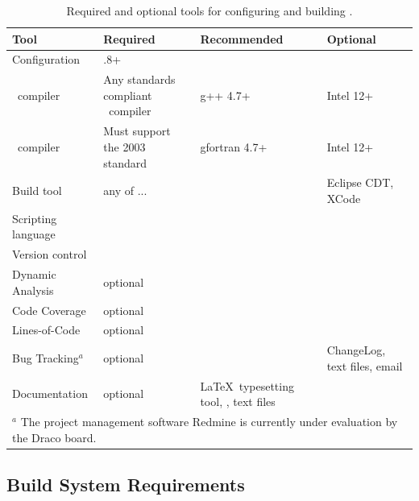 \begin{table}[ht]
  \begin{center}
    \caption{Required and optional tools for configuring and building \draco.}
    \label{tab:reqtools}
    \begin{tabular}{lp{1.5in}p{1.5in}p{1.5in}}\hline\hline
    
          Tool & Required  & Recommended & Optional \\ \hline
	Configuration & \cmake-2.8.8+ & \ctest & \cdash  \\
	\cpp\ compiler     & Any standards compliant \cpp\ compiler & g++ 4.7+ & Intel 12+ \\
	\fortran\ compiler & Must support the 2003 standard         & gfortran 4.7+ & Intel 12+ \\
	Build tool         & any of ... & \gmake & Eclipse CDT, XCode \\
	Scripting language & \cmake     & \python & \perl \\
	Version control    & \svn       & & \git \\
	Dynamic Analysis   & optional   & \valgrind & \\
	Code Coverage      & optional   & \bullseye & \\
	Lines-of-Code      & optional   & \cloc & \\
	Bug Tracking$^a$ & optional     & \teamforge & ChangeLog, text files, email \\
	Documentation & optional & \LaTeX\ typesetting tool, \doxygen, text files & \\	
	\hline \hline
	\multicolumn{4}{l}{$^a$ The project management software Redmine is currently under evaluation by the Draco board.} \\

    \end{tabular}
  \end{center}
\end{table}



\subsection{Build System Requirements}
\label{sec:build_sys_req}

